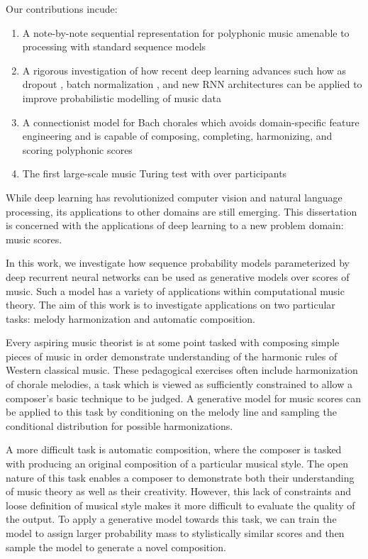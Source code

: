 Our contributions incude:
\begin{enumerate}
    \item A note-by-note sequential representation for polyphonic music
      amenable to processing with standard sequence models
    \item A rigorous investigation of how recent deep learning advances such
        how as dropout \citep{srivastava2014dropout}, batch normalization
        \citep{ioffe2015batch}, and new RNN architectures can be applied to
        improve probabilistic modelling of music data
    \item A connectionist model for Bach chorales which avoids domain-specific
      feature engineering and is capable of composing, completing, harmonizing,
      and scoring polyphonic scores
    \item The first large-scale music Turing test with over  participants
\end{enumerate}

While deep learning has revolutionized computer vision and natural language
processing, its applications to other domains are still emerging. This
dissertation is concerned with the applications of deep learning to a new
problem domain: music scores.

In this work, we investigate how sequence probability models parameterized by
deep recurrent neural networks can be used as generative models over scores of
music. Such a model has a variety of applications within computational music
theory. The aim of this work is to investigate applications on two particular
tasks: melody harmonization and automatic composition.

Every aspiring music theorist is at some point tasked with composing simple
pieces of music in order demonstrate understanding of the harmonic rules of
Western classical music. These pedagogical exercises often include
harmonization of chorale melodies, a task which is viewed as sufficiently
constrained to allow a composer's basic technique to be judged. A generative
model for music scores can be applied to this task by conditioning on the
melody line and sampling the conditional distribution for possible
harmonizations.

A more difficult task is automatic composition, where the composer is tasked
with producing an original composition of a particular musical style. The open
nature of this task enables a composer to demonstrate both their
understanding of music theory as well as their creativity. However, this lack of
constraints and loose definition of musical style makes it more difficult to
evaluate the quality of the output. To apply a generative model towards this
task, we can train the model to assign larger probability mass to stylistically
similar scores and then sample the model to generate a novel composition.

